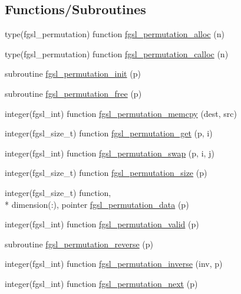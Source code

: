 \subsection*{Functions/\-Subroutines}
\begin{DoxyCompactItemize}
\item 
type(fgsl\-\_\-permutation) function \hyperlink{permutation_8finc_ada94635d088a532e6e74096b2dc431b0}{fgsl\-\_\-permutation\-\_\-alloc} (n)
\item 
type(fgsl\-\_\-permutation) function \hyperlink{permutation_8finc_a204b9ecb1475f3681277d149399f49c6}{fgsl\-\_\-permutation\-\_\-calloc} (n)
\item 
subroutine \hyperlink{permutation_8finc_ad59ced94489b46930f05e4e01e0fd91a}{fgsl\-\_\-permutation\-\_\-init} (p)
\item 
subroutine \hyperlink{permutation_8finc_a2cc1fdc81859de1228dfcaf62d03e610}{fgsl\-\_\-permutation\-\_\-free} (p)
\item 
integer(fgsl\-\_\-int) function \hyperlink{permutation_8finc_adf9b7a7b269e0d3679d687c82c2ee69a}{fgsl\-\_\-permutation\-\_\-memcpy} (dest, src)
\item 
integer(fgsl\-\_\-size\-\_\-t) function \hyperlink{permutation_8finc_a5bcaae948bb703b674973a966408e964}{fgsl\-\_\-permutation\-\_\-get} (p, i)
\item 
integer(fgsl\-\_\-int) function \hyperlink{permutation_8finc_a937965d21974947b8027697decfbdf2a}{fgsl\-\_\-permutation\-\_\-swap} (p, i, j)
\item 
integer(fgsl\-\_\-size\-\_\-t) function \hyperlink{permutation_8finc_a89bad660423aef5e3a8f59b93e3c3f7f}{fgsl\-\_\-permutation\-\_\-size} (p)
\item 
integer(fgsl\-\_\-size\-\_\-t) function, \\*
dimension(\-:), pointer \hyperlink{permutation_8finc_a2d8ed5cdeac5c7eb952d34f5c84b70b4}{fgsl\-\_\-permutation\-\_\-data} (p)
\item 
integer(fgsl\-\_\-int) function \hyperlink{permutation_8finc_afdb5b335edee506c4c5edf402c24de2e}{fgsl\-\_\-permutation\-\_\-valid} (p)
\item 
subroutine \hyperlink{permutation_8finc_aba5046d4e21611729ce03009b869d4db}{fgsl\-\_\-permutation\-\_\-reverse} (p)
\item 
integer(fgsl\-\_\-int) function \hyperlink{permutation_8finc_a70977eec8133e0d4159857f6ff86a80d}{fgsl\-\_\-permutation\-\_\-inverse} (inv, p)
\item 
integer(fgsl\-\_\-int) function \hyperlink{permutation_8finc_a67f05c2a45fe4df0f97618debdb10e11}{fgsl\-\_\-permutation\-\_\-next} (p)

\end{DoxyCompactItemize}
